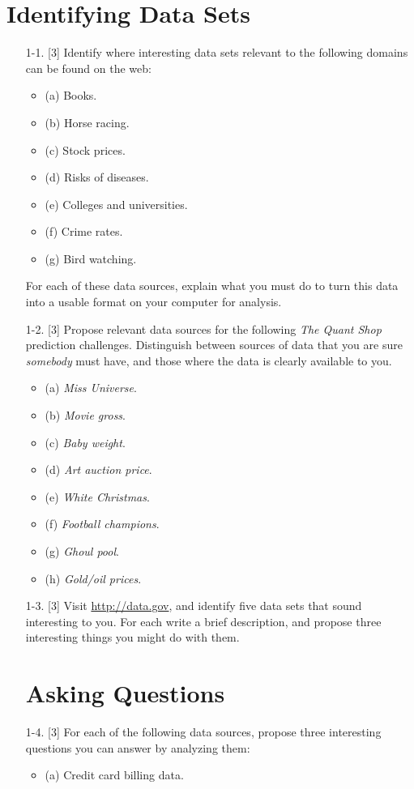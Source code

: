 \documentclass[10pt]{article}
\begin{document}
\section*{Identifying Data Sets}
\begin{enumerate}
   \item[1-1.] [3] Identify where interesting data sets relevant to the following domains can be found on the web:
   \begin{itemize}
       \item (a) Books.
       \item (b) Horse racing.
       \item (c) Stock prices.
       \item (d) Risks of diseases.
       \item (e) Colleges and universities.
       \item (f) Crime rates.
       \item (g) Bird watching.
   \end{itemize}
   For each of these data sources, explain what you must do to turn this data into a usable format on your computer for analysis.
   \item[1-2.] [3] Propose relevant data sources for the following \textit{The Quant Shop} prediction challenges. Distinguish between sources of data that you are sure \textit{somebody} must have, and those where the data is clearly available to you.
   \begin{itemize}
       \item (a) \textit{Miss Universe}.
       \item (b) \textit{Movie gross}.
       \item (c) \textit{Baby weight}.
       \item (d) \textit{Art auction price}.
       \item (e) \textit{White Christmas}.
       \item (f) \textit{Football champions}.
       \item (g) \textit{Ghoul pool}.
       \item (h) \textit{Gold/oil prices}.
   \end{itemize}
   \item[1-3.] [3] Visit \href{http://data.gov}{http://data.gov}, and identify five data sets that sound interesting to you. For each write a brief description, and propose three interesting things you might do with them.
   
\section*{Asking Questions}
   \item[1-4.] [3] For each of the following data sources, propose three interesting questions you can answer by analyzing them:
   \begin{itemize}
       \item (a) Credit card billing data.
   \end{itemize}
\end{enumerate}
\end{document}
